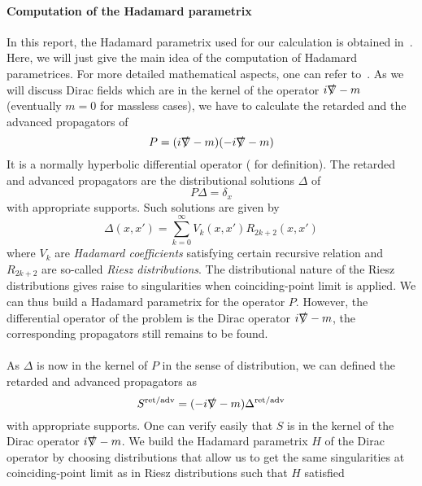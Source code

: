 \paragraph{Computation of the Hadamard parametrix}
In this report, the Hadamard parametrix used for our calculation is obtained in~\cite{Zahn2015}. 
Here, we will just give the main idea of the computation of Hadamard parametrices. 
For more detailed mathematical aspects, one can refer to~\cite{Bar2008}.
As we will discuss Dirac fields which are in the kernel of the operator $i\slashed{\nabla} - m$ (eventually $m=0$ for massless cases), 
we have to calculate the retarded and the advanced propagators of 
\begin{equation*}
P = (i\slashed{\nabla} - m)(-i\slashed{\nabla} -m) 
\end{equation*}
It is a normally hyperbolic differential operator (\cite{Bar2008} for definition).
The retarded and advanced propagators are the distributional solutions $\Delta$ of
\begin{equation*} 
P\Delta = \delta_x
\end{equation*}
with appropriate supports.
Such solutions are given by 
\begin{equation*}
\Delta(x,x') = \sum_{k=0}^\infty V_k(x,x') R_{2k+2}(x,x')
\end{equation*} 
where $V_k$ are \textit{Hadamard coefficients} satisfying certain recursive relation and $R_{2k+2}$ are so-called \textit{Riesz distributions}.
The distributional nature of the Riesz distributions gives raise to singularities when coinciding-point limit is applied. 
We can thus build a Hadamard parametrix for the operator $P$.
However, the differential operator of the problem is the Dirac operator $i\slashed{\nabla} -m$,
the corresponding propagators still remains to be found. \\\\
%
As $\Delta$ is now in the kernel of $P$ in the sense of distribution, 
we can defined the retarded and advanced propagators as 
\begin{equation*}
S^{\textrm{ret/adv}} = (-i\slashed{\nabla} - m)\Delta^{\textrm{ret/adv}} 
\end{equation*}
with appropriate supports.
One can verify easily that $S$ is in the kernel of the Dirac operator $i\slashed{\nabla} - m$.
We build the Hadamard parametrix $H$ of the Dirac operator by choosing distributions that allow us to get the same singularities at coinciding-point limit as in Riesz distributions such that $H$ satisfied
